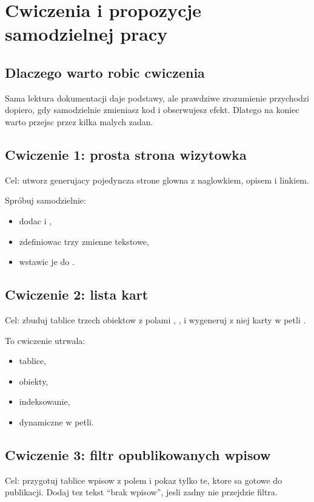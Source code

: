 \chapter{Cwiczenia i propozycje samodzielnej pracy}

\section{Dlaczego warto robic cwiczenia}
Sama lektura dokumentacji daje podstawy, ale prawdziwe zrozumienie przychodzi dopiero,
gdy samodzielnie zmieniasz kod i obserwujesz efekt. Dlatego na koniec warto przejsc
przez kilka malych zadan.

\section{Cwiczenie 1: prosta strona wizytowka}
Cel: utworz  generujacy pojedyncza strone glowna z naglowkiem, opisem i linkiem.

Spróbuj samodzielnie:

\begin{itemize}
  \item dodac  i ,
  \item zdefiniowac trzy zmienne tekstowe,
  \item wstawic je do .
\end{itemize}

\section{Cwiczenie 2: lista kart}
Cel: zbuduj tablice trzech obiektow z polami , , 
i wygeneruj z niej karty w petli .

To cwiczenie utrwala:

\begin{itemize}
  \item tablice,
  \item obiekty,
  \item indeksowanie,
  \item dynamiczne  w petli.
\end{itemize}

\section{Cwiczenie 3: filtr opublikowanych wpisow}
Cel: przygotuj tablice wpisow z polem  i pokaz tylko te, ktore sa gotowe do
publikacji. Dodaj tez tekst ``brak wpisow'', jesli zadny nie przejdzie filtra.

